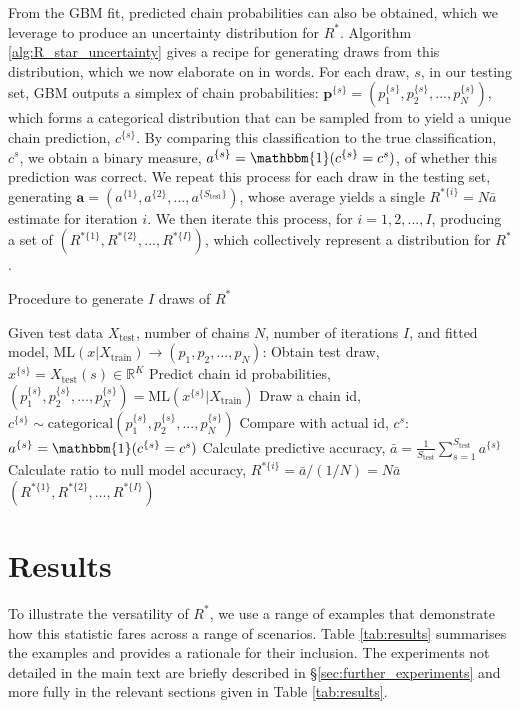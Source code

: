 \documentclass{article}
\begin{document}
From the GBM fit, predicted chain probabilities can also be obtained, which we leverage to produce an uncertainty distribution for $R^*$. Algorithm \ref{alg:R_star_uncertainty} gives a recipe for generating draws from this distribution, which we now elaborate on in words. For each draw, $s$, in our testing set, GBM outputs a simplex of chain probabilities: $\boldsymbol{p}^{\{s\}}=(p_1^{\{s\}},p_2^{\{s\}},...,p_N^{\{s\}})$, which forms a categorical distribution that can be sampled from to yield a unique chain prediction, $c^{\{s\}}$. By comparing this classification to the true classification, $c^s$, we obtain a binary measure, $a^{\{s\}}=\mathbbm{1}(c^{\{s\}}=c^s)$, of whether this prediction was correct. We repeat this process for each draw in the testing set, generating $\boldsymbol{a}=(a^{\{1\}},a^{\{2\}},...,a^{\{S_\text{test}\}})$, whose average yields a single $R^{*\{i\}}=N \bar{a}$ estimate for iteration $i$. We then iterate this process, for $i=1,2,...,I$, producing a set of $(R^{*\{1\}},R^{*\{2\}},...,R^{*\{I\}})$, which collectively represent a distribution for $R^*$. 


\begin{algorithm}[tb]
	\caption{Procedure to generate $I$ draws of $R^*$}
	\label{alg:R_star_uncertainty}
	\begin{algorithmic}
		\STATE Given test data $X_\text{test}$, number of chains $N$, number of iterations $I$, and fitted
		\STATE model, $\text{ML}(x|X_\text{train})\rightarrow(p_1,p_2,...,p_N)$:
		\STATE Obtain test draw, $x^{\{s\}}=X_\text{test}(s)\in \mathbb{R}^K$
		\STATE Predict chain id probabilities, $(p_1^{\{s\}},p_2^{\{s\}},...,p_N^{\{s\}})= \text{ML}(x^{\{s\}}|X_\text{train})$
		\STATE Draw a chain id, $c^{\{s\}} \sim \text{categorical}(p_1^{\{s\}},p_2^{\{s\}},...,p_N^{\{s\}})$
		\STATE Compare with actual id, $c^s$: $a^{\{s\}}=\mathbbm{1}(c^{\{s\}}=c^s)$
		\ENDFOR
		\STATE Calculate predictive accuracy, $\bar{a} = \frac{1}{S_\text{test}} \sum_{s=1}^{S_\text{test}} a^{\{s\}}$
		\STATE Calculate ratio to null model accuracy, $R^{*\{i\}} = \bar{a} / (1 / N) = N\bar{a}$
		\ENDFOR
		\RETURN $(R^{*\{1\}},R^{*\{2\}},...,R^{*\{I\}})$
	\end{algorithmic}
\end{algorithm}

\section{Results}\label{sec:results}
To illustrate the versatility of $R^*$, we use a range of examples that demonstrate how this statistic fares across a range of scenarios. Table \ref{tab:results} summarises the examples and provides a rationale for their inclusion. The experiments not detailed in the main text are briefly described in \S\ref{sec:further_experiments} and more fully in the relevant sections given in Table \ref{tab:results}.
\end{document}
